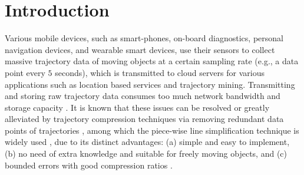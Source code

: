 \section{Introduction}
\label{sec-intro}

Various mobile devices, such as smart-phones, on-board diagnostics, personal navigation devices, and wearable smart devices, use their sensors to collect massive trajectory data of moving objects at a certain sampling rate (e.g., a data point every $5$ seconds), which is transmitted to cloud servers for various applications such as location based services and trajectory mining.
%
Transmitting and storing raw trajectory data consumes too much network bandwidth and storage capacity \cite{Chen:Trajectory, Meratnia:Spatiotemporal,Shi:Survey, Lin:Operb, Liu:BQS, Liu:Amnesic, Muckell:survey, Muckell:Compression,Cao:Spatio, Popa:Spatio,Nibali:Trajic}. %
%
%
It is known that these issues can be resolved or greatly alleviated by trajectory compression techniques via removing redundant data points of trajectories \cite{Douglas:Peucker, Hershberger:Speeding, Meratnia:Spatiotemporal,Lin:Operb, Liu:BQS, Liu:Amnesic,  Muckell:Compression, Chen:Trajectory, Cao:Spatio,  Nibali:Trajic, Long:Direction, Popa:Spatio, Han:Compress, Chen:Fast}, among which the piece-wise line simplification technique is widely used \cite{Douglas:Peucker, Meratnia:Spatiotemporal,  Muckell:Compression, Chen:Trajectory, Cao:Spatio, Liu:BQS, Liu:Amnesic, Lin:Operb, Chen:Fast}, due to its distinct advantages: (a) simple and easy to implement, (b) no need of extra knowledge and suitable for freely  moving  objects, and (c) bounded errors with good compression ratios \cite{Popa:Spatio,Lin:Operb}.


